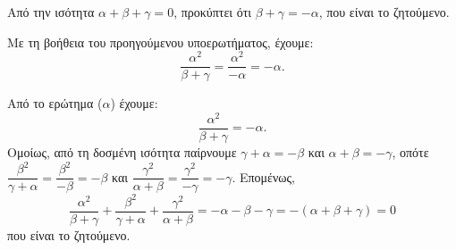 
\begin{alist}
\item 
\begin{rlist}
\item Από την ισότητα $\alpha + \beta + \gamma = 0$, προκύπτει ότι $\beta + \gamma = -\alpha$, που είναι το ζητούμενο.
\item Με τη βοήθεια του προηγούμενου υποερωτήματος, έχουμε:
\[\dfrac{\alpha^2}{\beta + \gamma} = \dfrac{\alpha^2}{-\alpha} = -\alpha.\]
\end{rlist}

\item Από το ερώτημα ($\alpha$) έχουμε:
\[\dfrac{\alpha^2}{\beta + \gamma} = -\alpha.\]
Ομοίως, από τη δοσμένη ισότητα παίρνουμε $\gamma + \alpha = -\beta$ και $\alpha + \beta = -\gamma$, οπότε
$\dfrac{\beta^2}{\gamma + \alpha} = \dfrac{\beta^2}{-\beta} = -\beta$ και $\dfrac{\gamma^2}{\alpha + \beta} = \dfrac{\gamma^2}{-\gamma} = -\gamma$.
Επομένως,
\[\dfrac{\alpha^2}{\beta + \gamma} + \dfrac{\beta^2}{\gamma + \alpha} + \dfrac{\gamma^2}{\alpha + \beta} = -\alpha - \beta - \gamma = -(\alpha + \beta + \gamma) = 0\]
που είναι το ζητούμενο.
\end{alist}

